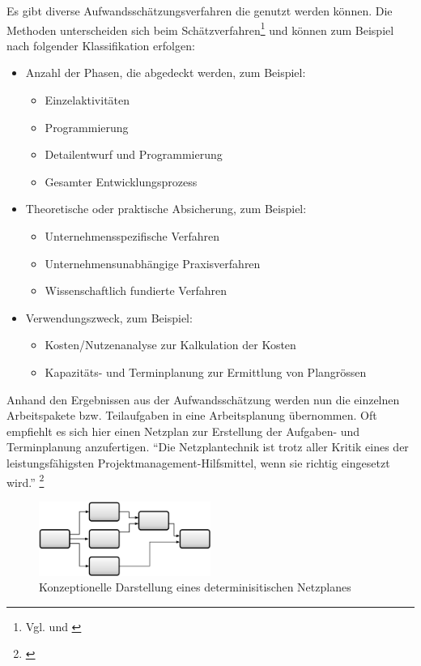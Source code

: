 Es gibt diverse Aufwandsschätzungsverfahren die genutzt werden können. Die Methoden unterscheiden
sich beim Schätzverfahren\footnote{Vgl. \citealp*{noth1986aufwandschaetzung} und \citealp*{knoell1991aufwandsschaetzung}}
und können zum Beispiel nach folgender Klassifikation erfolgen:

\begin{itemize}
    \item Anzahl der Phasen, die abgedeckt werden, zum Beispiel:
    \begin{itemize}
        \item Einzelaktivitäten
        \item Programmierung
        \item Detailentwurf und Programmierung
        \item Gesamter Entwicklungsprozess
    \end{itemize}
    \item Theoretische oder praktische Absicherung, zum Beispiel:
    \begin{itemize}
        \item Unternehmensspezifische Verfahren
        \item Unternehmensunabhängige Praxisverfahren
        \item Wissenschaftlich fundierte Verfahren
    \end{itemize}
    \item Verwendungszweck, zum Beispiel:
    \begin{itemize}
        \item Kosten/Nutzenanalyse zur Kalkulation der Kosten
        \item Kapazitäts- und Terminplanung zur Ermittlung von Plangrössen
    \end{itemize}
\end{itemize}

Anhand den Ergebnissen aus der Aufwandsschätzung werden nun die einzelnen
Arbeitspakete bzw. Teilaufgaben in eine Arbeitsplanung übernommen. Oft empfiehlt
es sich hier einen Netzplan zur Erstellung der Aufgaben- und Terminplanung
anzufertigen. ``Die Netzplantechnik ist trotz aller Kritik eines der 
leistungsfähigsten Projektmanagement-Hilfsmittel, wenn sie richtig eingesetzt wird.''
\footnote{\citealp*[S. 14]{burghardt2007einfuehrung}}

\begin{figure}[htbp]
\begin{center}
\includegraphics[width=0.5\textwidth,angle=0]{./bilder/theorie/03_darstellung_netzplan.pdf}
\caption{Konzeptionelle Darstellung eines determinisitischen Netzplanes}
\label{pic:03_darstellung_netzplan}
\end{center}
\end{figure}

